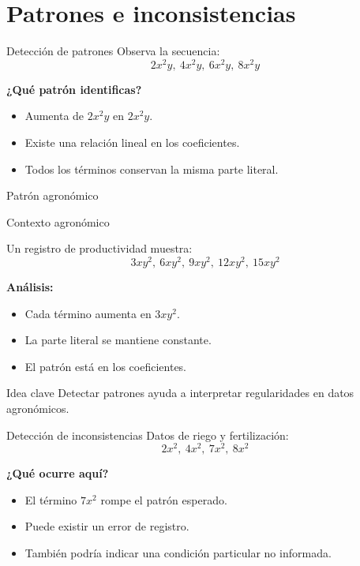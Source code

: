 \documentclass[handout,aspectratio=169,12pt]{beamer}
\newcommand{\IdeaClave}[1]{
	\begin{alertblock}{Idea clave}
		#1
	\end{alertblock}
}
\newcommand{\Agronomia}[1]{
	\begin{exampleblock}{Contexto agronómico}
		#1
	\end{exampleblock}
}
\begin{document}
	\section{Patrones e inconsistencias}
	\begin{frame}{Detección de patrones}
		Observa la secuencia:
		\[
		2x^2y,\ 4x^2y,\ 6x^2y,\ 8x^2y
		\]
		
		\pause
		\textbf{¿Qué patrón identificas?}
		\begin{itemize}
			\item Aumenta de \(2x^2y\) en \(2x^2y\).
			\pause
			\item Existe una relación lineal en los coeficientes.
			\pause
			\item Todos los términos conservan la misma parte literal.
		\end{itemize}
	\end{frame}
	
	\begin{frame}{Patrón agronómico}
		\Agronomia{
			Un registro de productividad muestra:
			\[
			3xy^2,\ 6xy^2,\ 9xy^2,\ 12xy^2,\ 15xy^2
			\]
		}
		
		\pause
		\textbf{Análisis:}
		\begin{itemize}
			\item Cada término aumenta en \(3xy^2\).
			\pause
			\item La parte literal se mantiene constante.
			\pause
			\item El patrón está en los coeficientes.
		\end{itemize}
		
		\pause
		\IdeaClave{Detectar patrones ayuda a interpretar regularidades en datos agronómicos.}
	\end{frame}
	
	\begin{frame}{Detección de inconsistencias}
		Datos de riego y fertilización:
		\[
		2x^2,\ 4x^2,\ 7x^2,\ 8x^2
		\]
		
		\pause
		\textbf{¿Qué ocurre aquí?}
		\begin{itemize}
			\item El término \(7x^2\) rompe el patrón esperado.
			\pause
			\item Puede existir un error de registro.
			\pause
			\item También podría indicar una condición particular no informada.
		\end{itemize}
	\end{frame}
	
\end{document}
